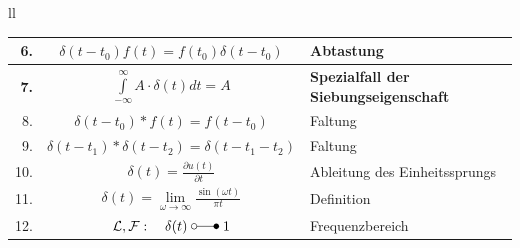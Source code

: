 \begin{tabular}{ll}
{\begin{tabular}{|r|c|l|}
	 		6. & $\delta(t-t_0)f(t) = f(t_0)\delta(t-t_0)$ &  Abtastung\index{Abtastung}\\ \hline
	 		\textbf{7.} & $\int\limits_{-\infty}^{\infty}A\cdot\delta(t)dt = A$ & \textbf{Spezialfall der Siebungseigenschaft} \\ \hline
	 		8. & $\delta(t-t_0)\ast f(t) = f(t-t_0)$ & Faltung\\ \hline
	 		9. & $\delta(t-t_1)\ast\delta(t-t_2) = \delta(t-t_1-t_2)$ & Faltung\index{Faltung}\\ \hline
			10. & $\delta(t)=\frac{\partial u(t)}{\partial t}$ & Ableitung des Einheitssprungs\index{Ableitung}\\ \hline
			11. & $\delta(t)=\lim\limits_{\omega\rightarrow \infty}\frac{\sin(\omega t)}{\pi t}$ & Definition\\ \hline 
			12. & $\mathcal{L}, \mathcal{F}:\quad \delta(t) \; \laplace \; 1$ 
			& Frequenzbereich
		\\ \hline
		\end{tabular}
		\\
		\vspace{.1cm}\\
		}
		\end{tabular}

	

		